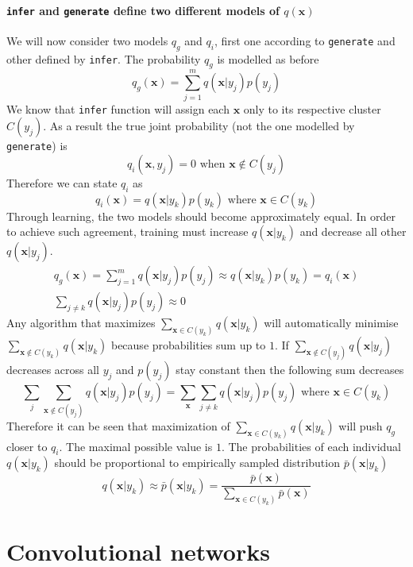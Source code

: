 \documentclass[12pt]{article}
\begin{document}
\paragraph{\texttt{infer} and \texttt{generate} define two different models of $q(\boldsymbol{x})$}
We will now consider two models $q_g$ and $q_i$, first one according to \texttt{generate} and other defined by \texttt{infer}. The probability $q_g$ is modelled as before
\[
q_g(\boldsymbol{x}) = \sum_{j=1}^{m} q(\boldsymbol{x}|y_j)p(y_j)
\]
We know that \texttt{infer} function will assign each $\boldsymbol{x}$ only to its respective cluster $C(y_j)$. As a result the true joint probability (not the one modelled by \texttt{generate}) is
\[
q_i(\boldsymbol{x},y_j) = 0 \text{ when } \boldsymbol{x}\notin C(y_j)
\]
Therefore we can state $q_i$ as
\[
q_i(\boldsymbol{x}) = q(\boldsymbol{x}|y_k)p(y_k)\text{ where }\boldsymbol{x}\in C(y_k)
\]
Through learning, the two models should become approximately equal. In order to achieve such agreement, training  must increase $q(\boldsymbol{x}|y_k)$ and decrease all other $q(\boldsymbol{x}|y_j)$. 
\begin{gather*}
	q_g(\boldsymbol{x}) = 	\sum_{j=1}^{m} q(\boldsymbol{x}|y_j)p(y_j) \approx q(\boldsymbol{x}|y_k)p(y_k) = q_i(\boldsymbol{x}) \\
	\sum_{j\ne k} q(\boldsymbol{x}|y_j)p(y_j) \approx 0 
\end{gather*}
Any algorithm that maximizes $\sum_{\boldsymbol{x}\in C(y_k)}q(\boldsymbol{x}|y_k)$ will automatically minimise $\sum_{\boldsymbol{x}\notin C(y_k)} q(\boldsymbol{x}|y_k)$  because probabilities sum up to $1$. If $\sum_{\boldsymbol{x}\notin C(y_j)} q(\boldsymbol{x}|y_j)$ decreases across all $y_j$ and $p(y_j)$ stay constant then the following sum decreases
\[
	\sum_{j} \sum_{\boldsymbol{x}\notin C(y_j)} q(\boldsymbol{x}|y_j) p(y_j) = \sum_{\boldsymbol{x}} \sum_{j\ne k}  q(\boldsymbol{x}|y_j) p(y_j) \text{ where }\boldsymbol{x}\in C(y_k)
\]
Therefore it can be seen that maximization of $\sum_{\boldsymbol{x}\in C(y_k)}q(\boldsymbol{x}|y_k)$ will push $q_g$ closer to $q_i$.  The maximal possible value is $1$.  The probabilities of each individual $q(\boldsymbol{x}|y_k)$ should be proportional to empirically sampled distribution $\bar{p}(\boldsymbol{x}|y_k)$
\[
q(\boldsymbol{x}|y_k) \approx \bar{p}(\boldsymbol{x}|y_k) = \frac{\bar{p}(\boldsymbol{x})}{\sum_{\boldsymbol{x}\in C(y_k)}\bar{p}(\boldsymbol{x})}
\]


\section{Convolutional networks}
\end{document}
